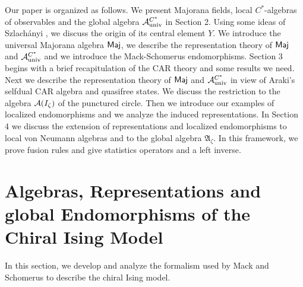 \documentclass[10pt,a4paper]{article}
\begin{document}
Our paper is organized as follows. We present
Majorana fields, local $C^*$-algebras of observables
and the global algebra ${\cal A}_{\rm univ}^{C^*}$ in
Section 2. Using some ideas of Szlach\'{a}nyi
\cite{Szl2}, we discuss the origin of its central
element $Y$. We introduce the universal Majorana
algebra ${\sf Maj}$,  we describe the representation
theory of ${\sf Maj}$ and ${\cal A}_{\rm univ}^{C^*}$
and we introduce the Mack-Schomerus endomorphisms.
Section 3 begins with a brief recapitulation of
the CAR theory and some results we need. Next we
describe the representation theory of ${\sf Maj}$
and ${\cal A}_{\rm univ}^{C^*}$ in view of Araki's
selfdual CAR algebra and quasifree states. We
discuss the restriction to the algebra
${\cal A}(I_\zeta)$ of the punctured circle.
Then we introduce our examples of localized
endomorphisms and we analyze the induced
representations. In Section 4 we discuss the
extension of representations and localized
endomorphisms to local von Neumann algebras and
to the global algebra $\mathfrak{A}_\zeta$. In this
framework, we prove fusion rules and give
statistics operators and a left inverse.

\section{Algebras, Representations and global
Endomorphisms of the Chiral Ising Model}
In this section, we develop and analyze the
formalism used by Mack and Schomerus to
describe the chiral Ising model.
\end{document}
